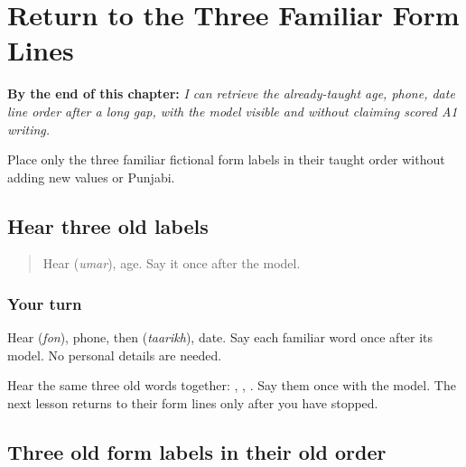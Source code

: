 
\chapter{Return to the Three Familiar Form Lines}
\label{ch:pa-form-order-r4}

\begin{chapteropening}
\textbf{By the end of this chapter:} \emph{I can retrieve the already-taught age, phone, date line order after a long gap, with the model visible and without claiming scored A1 writing.}

Place only the three familiar fictional form labels in their taught order without adding new values or Punjabi.
\end{chapteropening}

\section[\texorpdfstring{\pa{ਉਮਰ} · \pa{ਫ਼ੋਨ} · \pa{ਤਾਰੀਖ਼} (umar · fon · taarikh)}{ਉਮਰ · ਫ਼ੋਨ · ਤਾਰੀਖ਼ (umar · fon · taarikh)}]{Hear three old labels}

\label{lesson:PA-R172-form-labels-oral-bridge}



\begin{quote}
Hear \textbf{} (\emph{umar}), age. Say it once after the model.
\end{quote}

\subsection*{Your turn}
Hear \textbf{} (\emph{fon}), phone, then \textbf{} (\emph{taarikh}), date. Say each familiar word once after its model. No personal details are needed.

\begin{tcolorbox}[breakable,colback=teal!4,colframe=teal!35!black,title={Before you move on}]
Hear the same three old words together: \textbf{}, \textbf{}, \textbf{}. Say them once with the model. The next lesson returns to their form lines only after you have stopped.
\end{tcolorbox}
\section[\texorpdfstring{\pa{ਉਮਰ}: · \pa{ਫ਼ੋਨ} … (three familiar …)}{ਉਮਰ: · ਫ਼ੋਨ … (three familiar …)}]{Three old form labels in their old order}

